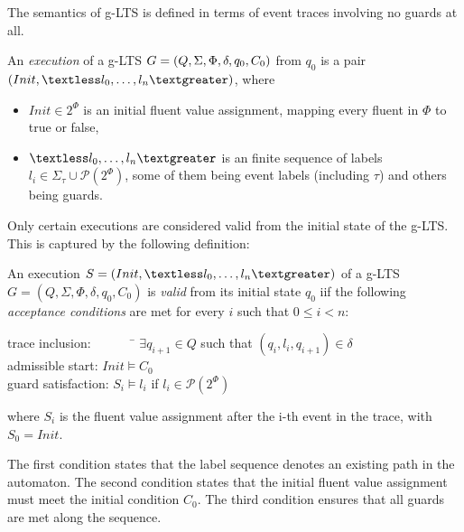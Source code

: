 The semantics of g-LTS is defined in terms of event traces involving no guards at all.

\begin{definition}
An \emph{execution} of a g-LTS $G = (Q,\Sigma,\Phi,\\\delta,q_{0},C_{0})$ from $q_0$ is a pair $(Init, \textless l_0, \ldots,l_n\textgreater)$, where 
\begin{itemize}
\item $Init \in 2^\Phi$ is an initial fluent value assignment, mapping every fluent in $\Phi$ to true or false,
\item $\textless l_0,\ldots,l_n \textgreater$ is an finite sequence of labels $l_i \in \Sigma_{\tau}\cup\mathcal{P}(2^\Phi)$, some of them being event labels (including $\tau$) and others being guards.
\end{itemize}
\end{definition}

Only certain executions are considered valid from the initial state of the g-LTS. This is captured by the following definition:

\begin{definition}
An execution $S = (Init,\textless l_0,\ldots,l_n\textgreater)$ of a g-LTS $G = (Q,\Sigma,\Phi,\delta,q_{0},C_{0})$ is \emph{valid} from its initial state $q_0$ iif the following \emph{acceptance conditions} are met for every $i$ such that $0 \leqslant i < n$:\\
\vspace{-0.8cm}
\begin{tabbing}
\indent trace inclusion:~~~~~~~\= $\exists q_{i+1} \in Q$ such that $(q_i,l_i,q_{i+1}) \in \delta$\\
\indent admissible start:      \> $Init \models C_0$ \\
\indent guard satisfaction:    \> $S_i \models l_i$ if $l_i \in \mathcal{P}(2^\Phi)$\\
\end{tabbing}
\vspace{-0.8cm}
where $S_i$ is the fluent value assignment after the i-th event in the trace, with $S_0 = Init$.
\end{definition}

The first condition states that the label sequence denotes an existing path in the automaton. The second condition states that the initial fluent value assignment must meet the initial condition $C_0$. The third condition ensures that all guards are met along the sequence.

